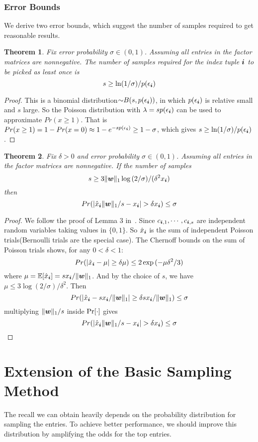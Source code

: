 \documentclass[letterpaper]{article}
\newcommand{\V}[1]{{\boldsymbol{{\MakeLowercase{#1}}}}}
\newcommand{\predx}{\hat{x}_{\V{i}}}
\newcommand{\norm}[2]{\|#1\|_{#2}}
\newtheorem{theorem}{Theorem}
\begin{document}
\subsubsection{Error Bounds}
We derive two error bounds, which suggest the number of samples required to get reasonable results.
\begin{theorem}\label{theo:ObservationBound}
Fix error probability $\sigma \in (0,1)$.
Assuming all entries in the factor matrices are nonnegative.
The number of samples required for the index tuple $\V{i}$ to be picked as least once is
\[
    s \geq \ln(1/\sigma)/p(\epsilon_{\V{i}})
\]
\end{theorem}
\begin{proof}
This is a binomial distribution${\sim}B(s,p(\epsilon_{\V{i}}))$,
in which $p(\epsilon_{\V{i}})$ is relative small and $s$ large.
So the Poisson distribution with $\lambda = sp(\epsilon_{\V{i}})$
can be used to approximate $Pr(x\geq1)$.
That is $Pr(x\geq1) = 1-Pr(x=0)\approx 1-e^{-sp(\epsilon_{\V{i}})} \geq 1-\sigma$,
which gives $s \geq \ln(1/\sigma)/p(\epsilon_{\V{i}})$.
\end{proof}

\begin{theorem}\label{theo:Bound}
Fix $\delta > 0$ and error probability $\sigma \in (0,1)$.
Assuming all entries in the factor matrices are nonnegative.
If the number of samples
\[
    s \geq 3\norm{\V{w}}{1}\log{(2/\sigma)}/(\delta^2 x_{\V{i}})
\]
then
\[
    Pr(|\predx\norm{\V{W}}{1}/s - x_{\V{i}}| > \delta x_{\V{i}}) \leq \sigma
\]
\end{theorem}

\begin{proof}
We follow the proof of Lemma 3 in~\cite{BaPiKoSe15}.
Since  $c_{\V{i},1},\cdots,c_{\V{i},s}$
are independent random variables taking values in $\{0,1\}$.
So $\predx$ is the sum of independent Poisson trials(Bernoulli trials are the special case).
The Chernoff bounds on the sum of Poisson trials shows, for any $0 <\delta <1 $:
\[
    Pr(|\predx - \mu|\geq\delta\mu) \leq 2\exp{(-\mu\delta^2/3)}
\]
where $\mu=\mathbb{E}[\predx]=sx_{\V{i}}/\norm{\V{W}}{1}$.
And by the choice of $s$, we have
$\mu\leq 3\log{(2/\sigma)/\delta^2}$.
Then
\[
    Pr(|\predx-sx_{\V{i}}/\norm{\V{W}}{1}|\geq\delta sx_{\V{i}}/\norm{\V{W}}{1}) \leq \sigma
\]
multiplying $\norm{\V{W}}{1}/s$ inside ${\rm Pr}[\cdot]$ gives
\[
    Pr(|\predx\norm{\V{W}}{1}/s - x_{\V{i}}| > \delta x_{\V{i}}) \leq \sigma
\]
\end{proof}


\section{Extension of the Basic Sampling Method}
The recall we can obtain heavily depends on
the probability distribution for sampling the entries.
To achieve better performance,
we should improve this distribution by amplifying the odds for the top entries.
\end{document}
